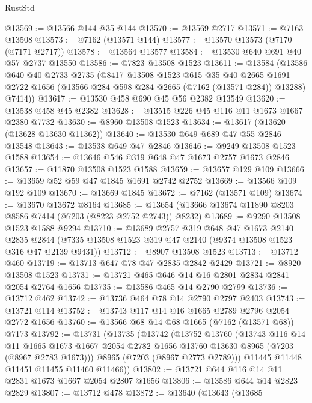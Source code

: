 \begin{lexlean}{RustStd}
\begin{coremodule}
@13569 := @13566 @144 @35 @144
@13570 := @13569 @2717
@13571 := @7163 @13508
@13573 := @7162 (@13571 @144)
@13577 := @13570 @13573 (@7170 (@7171 @2717))
@13578 := @13564 @13577
@13584 := @13530 @640 @691 @40 @57 @2737 @13550
@13586 := @7823 @13508 @1523
@13611 := @13584
    (@13586
      @640
      @40
      @2733
      @2735
      (@8417
        @13508
        @1523
        @615
        @35
        @40
        @2665
        @1691
        @2722
        @1656
        (@13566 @284 @598 @284 @2665 (@7162 (@13571 @284)) @13288)
        @7414))
@13617 := @13530 @458 @690 @45 @56 @2382 @13549
@13620 := @13538 @458 @45 @2382
@13628 := @13515 @226 @45 @116 @11 @1673 @1667 @2380 @7732
@13630 := @8960 @13508 @1523
@13634 := @13617 (@13620 (@13628 @13630 @11362))
@13640 := @13530 @649 @689 @47 @55 @2846 @13548
@13643 := @13538 @649 @47 @2846
@13646 := @9249 @13508 @1523 @1588
@13654 := @13646 @546 @319 @648 @47 @1673 @2757 @1673 @2846
@13657 := @11870 @13508 @1523 @1588
@13659 := @13657 @129 @109
@13666 := @13659 @52 @59 @47 @1845 @1691 @2742 @2752
@13669 := @13566 @109 @192 @109
@13670 := @13669 @1845
@13672 := @7162 (@13571 @109)
@13674 := @13670 @13672 @8164
@13685 := @13654 (@13666 @13674 @11890 @8203 @8586 @7414 (@7203 (@8223 @2752 @2743)) @8232)
@13689 := @9290 @13508 @1523 @1588 @9294
@13710 := @13689
    @2757
    @319
    @648
    @47
    @1673
    @2140
    @2835
    @2844
    (@7335 @13508 @1523 @319 @47 @2140 (@9374 @13508 @1523 @316 @47 @2139 @9431))
@13712 := @8907 @13508 @1523
@13713 := @13712 @460
@13719 := @13713 @647 @78 @47 @2835 @2842 @2429
@13721 := @8920 @13508 @1523
@13731 := @13721 @465 @646 @14 @16 @2801 @2834 @2841 @2054 @2764 @1656
@13735 := @13586 @465 @14 @2790 @2799
@13736 := @13712 @462
@13742 := @13736 @464 @78 @14 @2790 @2797 @2403
@13743 := @13721 @114
@13752 := @13743 @117 @14 @16 @1665 @2789 @2796 @2054 @2772 @1656
@13760 := @13566 @68 @14 @68 @1665 (@7162 (@13571 @68)) @7173
@13792 := @13731
    (@13735
      (@13742
        (@13752
          @13760
          (@13743
            @116
            @14
            @11
            @1665
            @1673
            @1667
            @2054
            @2782
            @1656
            @13760
            @13630
            @8965
            (@7203 (@8967 @2783 @1673)))
          @8965
          (@7203 (@8967 @2773 @2789)))
        @11445
        @11448
        @11451
        @11455
        @11460
        @11466))
@13802 := @13721 @644 @116 @14 @11 @2831 @1673 @1667 @2054 @2807 @1656
@13806 := @13586 @644 @14 @2823 @2829
@13807 := @13712 @478
@13872 := @13640
    (@13643
      (@13685

\end{coremodule}
\end{lexlean}

